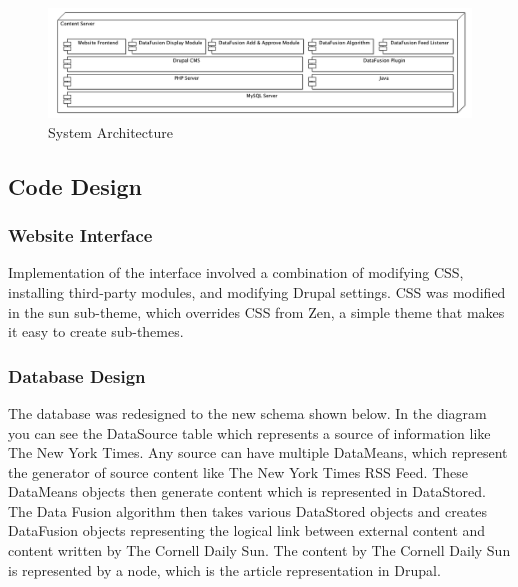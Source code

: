 \documentclass[10pt]{article} %
\begin{document}
\begin{figure}[htbp]
\begin{center}
\includegraphics[width=\columnwidth]{images/software_stack}
\caption{System Architecture}
\end{center}
\end{figure}

\subsection{Code Design}

\subsubsection{Website Interface}

Implementation of the interface involved a combination of modifying CSS, installing third-party modules, and modifying Drupal settings. CSS was modified in the sun sub-theme, which overrides CSS from Zen, a simple theme that makes it easy to create sub-themes.

\subsubsection{Database Design}

The database was redesigned to the new schema shown below. In the diagram you can see the DataSource table which represents a source of information like The New York Times. Any source can have multiple DataMeans, which represent the generator of source content like The New York Times RSS Feed. These DataMeans objects then generate content which is represented in DataStored. The Data Fusion algorithm then takes various DataStored objects and creates DataFusion objects representing the logical link between external content and content written by The Cornell Daily Sun. The content by The Cornell Daily Sun is represented by a node, which is the article representation in Drupal.
\end{document}
